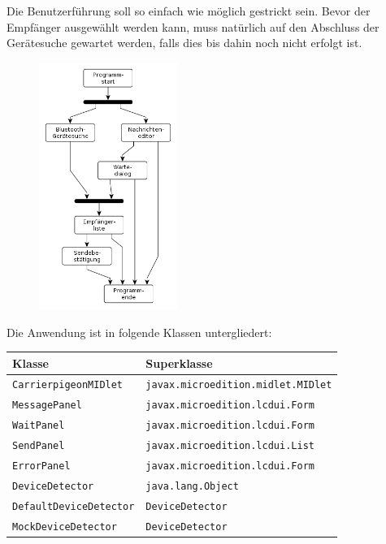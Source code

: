 \documentclass[ngerman]{article}
\begin{document}
Die Benutzerführung soll so einfach wie möglich gestrickt sein. Bevor der Em\-pfänger
ausgewählt werden kann, muss natürlich auf den Abschluss der Ge\-rä\-te\-suche gewartet
werden, falls dies bis dahin noch nicht erfolgt ist.

\begin{figure}[h!] \begin{center}
    \includegraphics[width=0.4\textwidth]{media/mobile-client-flow}
\end{center} \end{figure}

Die Anwendung ist in folgende Klassen untergliedert:

\begin{tabular}{|l|l|}
    \hline
    {\bf Klasse} & {\bf Superklasse} \\
    \hline
    {\tt CarrierpigeonMIDlet} & {\tt javax.microedition.midlet.MIDlet} \\
    \hline
    {\tt MessagePanel} & {\tt javax.microedition.lcdui.Form} \\
    \hline
    {\tt WaitPanel} & {\tt javax.microedition.lcdui.Form} \\
    \hline
    {\tt SendPanel} & {\tt javax.microedition.lcdui.List} \\
    \hline
    {\tt ErrorPanel} & {\tt javax.microedition.lcdui.Form} \\
    \hline
    {\tt DeviceDetector} & {\tt java.lang.Object}\\
    \hline
    {\tt DefaultDeviceDetector} & {\tt DeviceDetector} \\
    \hline
    {\tt MockDeviceDetector} & {\tt DeviceDetector} \\
    \hline
\end{tabular}
\end{document}
